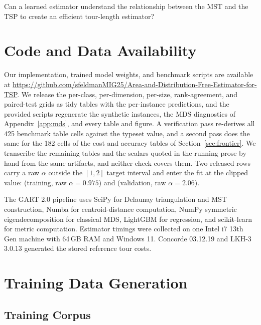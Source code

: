 \documentclass{article}
\begin{document}
Can a learned estimator understand the relationship between the MST and the TSP to create an efficient tour-length estimator?


{\small
}

\clearpage
\appendix

\section{Code and Data Availability} \label{app:code}

Our implementation, trained model weights, and benchmark scripts are available at \url{https://github.com/sfeldmanMIG25/Area-and-Distribution-Free-Estimator-for-TSP}. We release the per-class, per-dimension, per-size, rank-agreement, and paired-test grids as tidy tables with the per-instance predictions, and the provided scripts regenerate the synthetic instances, the MDS diagnostics of Appendix~\ref{app:mds}, and every table and figure. A verification pass re-derives all 425 benchmark table cells against the typeset value, and a second pass does the same for the 182 cells of the cost and accuracy tables of Section~\ref{sec:frontier}. We transcribe the remaining tables and the scalars quoted in the running prose by hand from the same artifacts, and neither check covers them.
Two released rows carry a raw $\alpha$ outside the $[1,2]$ target interval and enter the fit at the clipped value:  (training, raw $\alpha=0.975$) and  (validation, raw $\alpha=2.06$).

The GART 2.0 pipeline uses SciPy \citep{scipy2020} for Delaunay triangulation \citep{delaunay1934} and MST construction, Numba \citep{numba2015} for centroid-distance computation, NumPy \citep{harris2020numpy} symmetric eigendecomposition for classical MDS, LightGBM \citep{ke2017lightgbm} for regression, and scikit-learn \citep{sklearn2011} for metric computation. Estimator timings were collected on one Intel i7 13th Gen machine with 64\,GB RAM and Windows 11. Concorde 03.12.19 and LKH-3 3.0.13 generated the stored reference tour costs.

\section{Training Data Generation} \label{app:training}



\subsection{Training Corpus}
\end{document}
